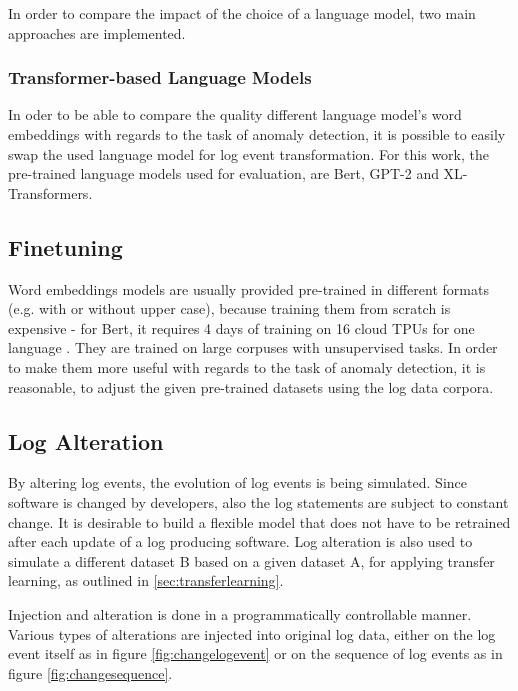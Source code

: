 In order to compare the impact of the choice of a language model, two main approaches are implemented.

\subsubsection{Transformer-based Language Models \label{transformer-approach}}
In oder to be able to compare the quality different language model's word embeddings with regards to the task of anomaly detection, it is possible to easily swap the used language model for log event transformation. For this work, the pre-trained language models used for evaluation, are Bert, GPT-2 and XL-Transformers.



\subsection{Finetuning\label{sec:finetuning}}
Word embeddings models are usually provided pre-trained in different formats (e.g. with or without upper case), because training them from scratch is expensive - for Bert, it requires 4 days of training on 16 cloud TPUs for one language \cite{googlebert}. They are trained on large corpuses with unsupervised tasks. In order to make them more useful with regards to the task of anomaly detection, it is reasonable, to adjust the given pre-trained datasets using the log data corpora.

\subsection{Log Alteration\label{sec:logs_alteration}}
By altering log events, the evolution of log events is being simulated. Since software is changed by developers, also the log statements are subject to constant change. It is desirable to build a flexible model that does not have to be retrained after each update of a log producing software. Log alteration is also used to simulate a different dataset B based on a given dataset A, for applying transfer learning, as outlined in \ref{sec:transferlearning}.

Injection and alteration is done in a programmatically controllable manner. Various types of alterations are injected into original log data, either on the log event itself as in figure \ref{fig:changelogevent} or on the sequence of log events as in figure \ref{fig:changesequence}.

